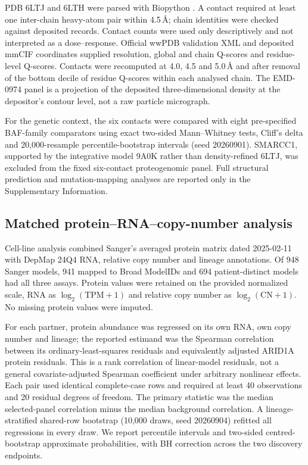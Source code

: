 \documentclass[journal=jprobs,manuscript=article,layout=traditional]{achemso}
\begin{document}
PDB 6LTJ and 6LTH were parsed with Biopython \citep{cock2009,he2020}. A contact required at least one inter-chain heavy-atom pair within 4.5\,\AA{}; chain identities were checked against deposited records. Contact counts were used only descriptively and not interpreted as a dose--response. Official wwPDB validation XML and deposited mmCIF coordinates supplied resolution, global and chain Q-scores and residue-level Q-scores. Contacts were recomputed at 4.0, 4.5 and 5.0\,\AA{} and after removal of the bottom decile of residue Q-scores within each analysed chain. The EMD-0974 panel is a projection of the deposited three-dimensional density at the depositor's contour level, not a raw particle micrograph.

For the genetic context, the six contacts were compared with eight pre-specified BAF-family comparators using exact two-sided Mann--Whitney tests, Cliff's delta and 20,000-resample percentile-bootstrap intervals (seed 20260901). SMARCC1, supported by the integrative model 9A0K rather than density-refined 6LTJ, was excluded from the fixed six-contact proteogenomic panel. Full structural prediction and mutation-mapping analyses are reported only in the Supplementary Information.

\subsection{Matched protein--RNA--copy-number analysis}

Cell-line analysis combined Sanger's averaged protein matrix dated 2025-02-11 with DepMap 24Q4 RNA, relative copy number and lineage annotations. Of 948 Sanger models, 941 mapped to Broad ModelIDs and 694 patient-distinct models had all three assays. Protein values were retained on the provided normalized scale, RNA as $\log_2(\mathrm{TPM}+1)$ and relative copy number as $\log_2(\mathrm{CN}+1)$. No missing protein values were imputed.

For each partner, protein abundance was regressed on its own RNA, own copy number and lineage; the reported estimand was the Spearman correlation between its ordinary-least-squares residuals and equivalently adjusted ARID1A protein residuals. This is a rank correlation of linear-model residuals, not a general covariate-adjusted Spearman coefficient under arbitrary nonlinear effects. Each pair used identical complete-case rows and required at least 40 observations and 20 residual degrees of freedom. The primary statistic was the median selected-panel correlation minus the median background correlation. A lineage-stratified shared-row bootstrap (10,000 draws, seed 20260904) refitted all regressions in every draw. We report percentile intervals and two-sided centred-bootstrap approximate probabilities, with BH correction across the two discovery endpoints.
\end{document}
